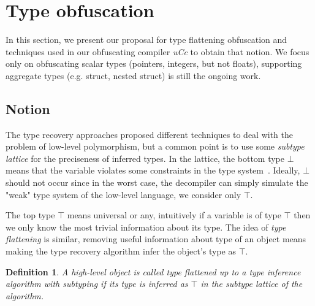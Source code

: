 \documentclass[compsoc,conference,a4paper,10pt,times]{IEEEtran}
\newtheorem{definition}{Definition}
\begin{document}
\section{Type obfuscation}
\noindent
In this section, we present our proposal for type flattening obfuscation and techniques used in
our obfuscating compiler \emph{uCc} to obtain that notion. We
focus only on obfuscating scalar types (pointers, integers, but not floats), supporting aggregate types
(e.g. struct, nested struct) is still the ongoing work.


\subsection{Notion}
\noindent
The type recovery approaches proposed different techniques to deal with the problem of
low-level polymorphism, but a common point
is to use some \emph{subtype lattice}
for the preciseness of inferred types. In the lattice, the bottom type $\bot$ means
that the variable violates some constraints in the type system~\cite{lee_tie_2011}.
Ideally, $\bot$ should not occur since in the worst case, the decompiler can simply
simulate the "weak" type system of the low-level language, we consider only $\top$.

The top type $\top$ means universal or any, intuitively if a variable is of type $\top$ then we only
know the most trivial information about its type.
The idea of \emph{type flattening} is similar, removing useful information about type
of an object means making the type recovery algorithm infer the object's type as $\top$.

\begin{definition}
  A high-level object is called type flattened up to a type inference algorithm with subtyping
  if its type is inferred as $\top$ in the subtype lattice of the algorithm.
\end{definition}
\end{document}
